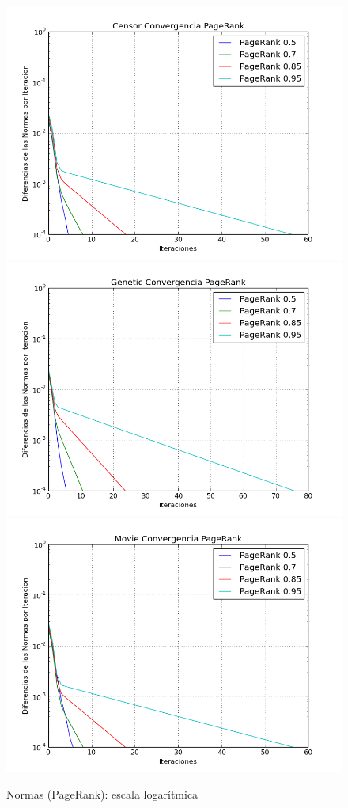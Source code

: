 \documentclass[a4paper]{article}
\begin{document}
\begin{figure}[htbp]
\centering
\includegraphics[scale=0.25]{img/Normas-Page-Censor.png} 
\includegraphics[scale=0.25]{img/Normas-Page-Genetic.png} 
\includegraphics[scale=0.25]{img/Normas-Page-Movie.png}

\caption{Normas (PageRank): escala logarítmica}
\end{figure}
\end{document}

